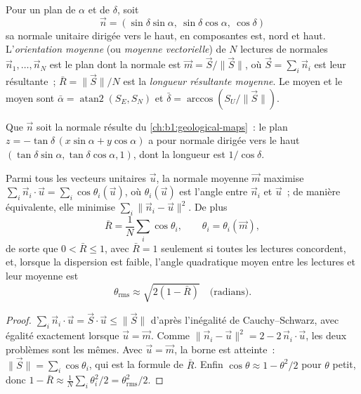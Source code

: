 \begin{definition}\label{def:b1:field-lab-methods-1:mean-orientation}
Pour un plan de  $\alpha$ et de  $\delta$, soit
\[
  \vec n = (\sin\delta\sin\alpha,\ \sin\delta\cos\alpha,\ \cos\delta)
\]
sa normale unitaire dirigée vers le haut, en composantes est, nord et haut.
L'\emph{orientation moyenne} (ou \emph{moyenne vectorielle}) de $N$ lectures de normales
$\vec n_1, \dots, \vec n_N$ est le plan dont la normale est
$\vec m = \vec S/\|\vec S\|$, où $\vec S = \sum_i \vec n_i$ est leur
résultante~; $\bar R = \|\vec S\|/N$ est la \emph{longueur résultante moyenne}.
Le  moyen et le  moyen sont
$\bar\alpha = \operatorname{atan2}(S_E, S_N)$
et $\bar\delta = \arccos(S_U/\|\vec S\|)$.
\end{definition}

Que $\vec n$ soit la normale résulte du \cref{ch:b1:geological-maps}~: le plan
$z = -\tan\delta\,(x\sin\alpha + y\cos\alpha)$ a pour normale dirigée vers le
haut $(\tan\delta\sin\alpha, \tan\delta\cos\alpha, 1)$, dont la longueur est
$1/\cos\delta$.

\begin{proposition}\label{prop:b1:field-lab-methods-1:vector-mean}
Parmi tous les vecteurs unitaires $\vec u$, la normale moyenne $\vec m$ maximise
$\sum_i \vec n_i\cdot\vec u = \sum_i \cos\theta_i(\vec u)$, où
$\theta_i(\vec u)$ est l'angle entre $\vec n_i$ et $\vec u$~; de manière
équivalente, elle minimise $\sum_i \|\vec n_i - \vec u\|^2$. De plus
\[
  \bar R = \frac1N\sum_i \cos\theta_i, \qquad \theta_i = \theta_i(\vec m),
\]
de sorte que $0 < \bar R \le 1$, avec $\bar R = 1$ seulement si toutes les
lectures concordent, et, lorsque la dispersion est faible, l'angle quadratique
moyen entre les lectures et leur moyenne est
\[
  \theta_{\text{rms}} \approx \sqrt{2(1 - \bar R)} \quad\text{(radians)}.
\]
\end{proposition}

\begin{proof}
$\sum_i \vec n_i\cdot\vec u = \vec S\cdot\vec u \le \|\vec S\|$ d'après
l'inégalité de Cauchy--Schwarz, avec égalité exactement lorsque $\vec u = \vec m$.
Comme $\|\vec n_i - \vec u\|^2 = 2 - 2\,\vec n_i\cdot\vec u$, les deux problèmes
sont les mêmes. Avec $\vec u = \vec m$, la borne est atteinte~:
$\|\vec S\| = \sum_i\cos\theta_i$, qui est la formule de $\bar R$. Enfin
$\cos\theta \approx 1 - \theta^2/2$ pour $\theta$ petit, donc $1 - \bar R \approx
\frac1N\sum_i\theta_i^2/2 = \theta_{\text{rms}}^2/2$.
\end{proof}

